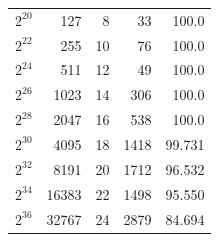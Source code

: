 \documentclass[runningheads]{llncs}
\begin{document}
\begin{table}[!h]
\begin{tabular}{rrrrr}
		\rowcolor[HTML]{FFFFFF} 
		$2^{20}$                                                             & 127                                                                              & 8                            & 33                        & 100.0                          \\
		\rowcolor[HTML]{FFFFFF} 
		$2^{22}$                                                              & 255                                                                              & 10                           & 76                        & 100.0                          \\
		\rowcolor[HTML]{FFFFFF} 
		$2^{24}$                                                              & 511                                                                              & 12                           & 49                        & 100.0                          \\
		\rowcolor[HTML]{FFFFFF} 
		$2^{26}$                                                             & 1023                                                                             & 14                           & 306                       & 100.0                          \\
		\rowcolor[HTML]{FFFFFF} 
		$2^{28}$                                                              & 2047                                                                             & 16                           & 538                       & 100.0                          \\
		\rowcolor[HTML]{FFFFFF} 
		$2^{30}$                                                              & 4095                                                                             & 18                           & 1418                      & 99.731                       \\
		\rowcolor[HTML]{FFFFFF} 
		$2^{32}$                                                              & 8191                                                                             & 20                           & 1712                      & 96.532                       \\
		\rowcolor[HTML]{FFFFFF} 
		$2^{34}$                                                              & 16383                                                                            & 22                           & 1498                      & 95.550                       \\
		\rowcolor[HTML]{FFFFFF} 
		$2^{36}$                                                              & 32767                                                                            & 24                           & 2879                      & 84.694                       \\

\end{tabular}
\end{table}
\end{document}
